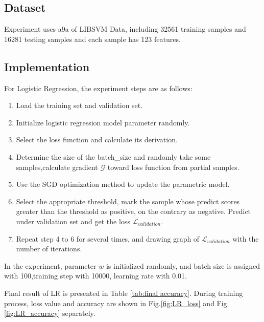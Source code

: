 \documentclass[journal, a4paper]{IEEEtran}
\begin{document}
\subsection{Dataset}
Experiment uses a9a of LIBSVM Data, including 32561 training samples and 16281 testing samples and each sample has 123 features.

\subsection{Implementation}
For Logistic Regression, the experiment steps are as follows:
\begin{enumerate}
  \item Load the training set and validation set.
  \item Initialize logistic regression model parameter randomly.
  \item Select the loss function and calculate its derivation.
  \item Determine the size of the batch\_size and randomly take some samples,calculate gradient $\mathcal{G}$ toward loss function from partial samples.
  \item Use the SGD optimization method to update the parametric model.
  \item Select the appropriate threshold, mark the sample whose predict scores greater than the threshold as positive, on the contrary as negative. Predict under validation set and get the loss $\mathcal{L}_{validation}$.
  \item Repeat step 4 to 6 for several times, and drawing graph of $\mathcal{L}_{validation}$ with the number of iterations.
\end{enumerate}

In the experiment, parameter $w$ is initialized randomly, and batch size is assigned with 100,training step with 10000, learning rate with 0.01.

Final result of LR is presented in Table \ref{tab:final accuracy}. During training process, loss value and accuracy are shown in Fig.\ref{fig:LR_loss} and Fig.\ref{fig:LR_accuracy} separately.
\end{document}
